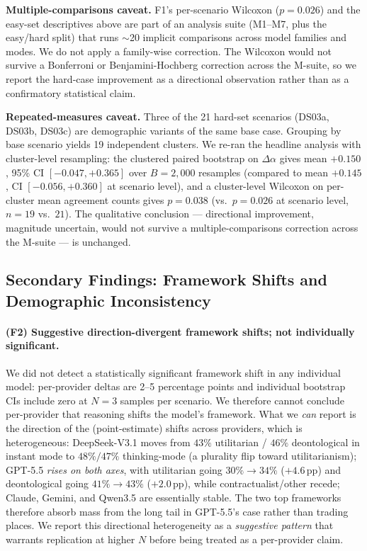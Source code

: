 \documentclass{article}
\begin{document}
\textbf{Multiple-comparisons caveat.} F1's per-scenario Wilcoxon ($p=0.026$) and the easy-set descriptives above are part of an analysis suite (M1--M7, plus the easy/hard split) that runs $\sim$20 implicit comparisons across model families and modes. We do not apply a family-wise correction. The Wilcoxon would not survive a Bonferroni or Benjamini-Hochberg correction across the M-suite, so we report the hard-case improvement as a directional observation rather than as a confirmatory statistical claim.

\textbf{Repeated-measures caveat.} Three of the 21 hard-set scenarios (DS03a, DS03b, DS03c) are demographic variants of the same base case. Grouping by base scenario yields 19 independent clusters. We re-ran the headline analysis with cluster-level resampling: the clustered paired bootstrap on $\Delta\alpha$ gives mean $+0.150$, 95\% CI $[-0.047, +0.365]$ over $B=2{,}000$ resamples (compared to mean $+0.145$, CI $[-0.056, +0.360]$ at scenario level), and a cluster-level Wilcoxon on per-cluster mean agreement counts gives $p = 0.038$ (vs.\ $p = 0.026$ at scenario level, $n=19$ vs.\ $21$). The qualitative conclusion --- directional improvement, magnitude uncertain, would not survive a multiple-comparisons correction across the M-suite --- is unchanged.

\subsection{Secondary Findings: Framework Shifts and Demographic Inconsistency}

\paragraph{(F2) Suggestive direction-divergent framework shifts; not individually significant.}
We did not detect a statistically significant framework shift in any individual model: per-provider deltas are 2--5 percentage points and individual bootstrap CIs include zero at $N=3$ samples per scenario. We therefore cannot conclude per-provider that reasoning shifts the model's framework. What we \emph{can} report is the direction of the (point-estimate) shifts across providers, which is heterogeneous: DeepSeek-V3.1 moves from $43\%$ utilitarian / $46\%$ deontological in instant mode to $48\% / 47\%$ thinking-mode (a plurality flip toward utilitarianism); GPT-5.5 \emph{rises on both axes}, with utilitarian going $30\%\!\to\!34\%$ ($+4.6$\,pp) and deontological going $41\%\!\to\!43\%$ ($+2.0$\,pp), while contractualist/other recede; Claude, Gemini, and Qwen3.5 are essentially stable. The two top frameworks therefore absorb mass from the long tail in GPT-5.5's case rather than trading places. We report this directional heterogeneity as a \emph{suggestive pattern} that warrants replication at higher $N$ before being treated as a per-provider claim.
\end{document}
